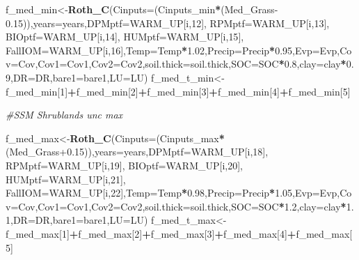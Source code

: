 \documentclass[
  10pt,
  b5paper,
]{book}
\newenvironment{Shaded}{\begin{snugshade}}{\end{snugshade}}
\newcommand{\CommentTok}[1]{\textcolor[rgb]{0.56,0.35,0.01}{\textit{#1}}}
\newcommand{\DataTypeTok}[1]{\textcolor[rgb]{0.13,0.29,0.53}{#1}}
\newcommand{\DecValTok}[1]{\textcolor[rgb]{0.00,0.00,0.81}{#1}}
\newcommand{\FloatTok}[1]{\textcolor[rgb]{0.00,0.00,0.81}{#1}}
\newcommand{\KeywordTok}[1]{\textcolor[rgb]{0.13,0.29,0.53}{\textbf{#1}}}
\newcommand{\NormalTok}[1]{#1}
\newcommand{\OperatorTok}[1]{\textcolor[rgb]{0.81,0.36,0.00}{\textbf{#1}}}
\begin{document}
\begin{Shaded}
\begin{Highlighting}[]
\NormalTok{f_med_min<-}\KeywordTok{Roth_C}\NormalTok{(}\DataTypeTok{Cinputs=}\NormalTok{(Cinputs_min}\OperatorTok{*}\NormalTok{(Med_Grass}\FloatTok{-0.15}\NormalTok{)),}\DataTypeTok{years=}\NormalTok{years,}\DataTypeTok{DPMptf=}\NormalTok{WARM_UP[i,}\DecValTok{12}\NormalTok{], }\DataTypeTok{RPMptf=}\NormalTok{WARM_UP[i,}\DecValTok{13}\NormalTok{], }\DataTypeTok{BIOptf=}\NormalTok{WARM_UP[i,}\DecValTok{14}\NormalTok{], }\DataTypeTok{HUMptf=}\NormalTok{WARM_UP[i,}\DecValTok{15}\NormalTok{], }\DataTypeTok{FallIOM=}\NormalTok{WARM_UP[i,}\DecValTok{16}\NormalTok{],}\DataTypeTok{Temp=}\NormalTok{Temp}\OperatorTok{*}\FloatTok{1.02}\NormalTok{,}\DataTypeTok{Precip=}\NormalTok{Precip}\OperatorTok{*}\FloatTok{0.95}\NormalTok{,}\DataTypeTok{Evp=}\NormalTok{Evp,}\DataTypeTok{Cov=}\NormalTok{Cov,}\DataTypeTok{Cov1=}\NormalTok{Cov1,}\DataTypeTok{Cov2=}\NormalTok{Cov2,}\DataTypeTok{soil.thick=}\NormalTok{soil.thick,}\DataTypeTok{SOC=}\NormalTok{SOC}\OperatorTok{*}\FloatTok{0.8}\NormalTok{,}\DataTypeTok{clay=}\NormalTok{clay}\OperatorTok{*}\FloatTok{0.9}\NormalTok{,}\DataTypeTok{DR=}\NormalTok{DR,}\DataTypeTok{bare1=}\NormalTok{bare1,}\DataTypeTok{LU=}\NormalTok{LU)}
\NormalTok{f_med_t_min<-f_med_min[}\DecValTok{1}\NormalTok{]}\OperatorTok{+}\NormalTok{f_med_min[}\DecValTok{2}\NormalTok{]}\OperatorTok{+}\NormalTok{f_med_min[}\DecValTok{3}\NormalTok{]}\OperatorTok{+}\NormalTok{f_med_min[}\DecValTok{4}\NormalTok{]}\OperatorTok{+}\NormalTok{f_med_min[}\DecValTok{5}\NormalTok{]}

\CommentTok{#SSM Shrublands unc max}

\NormalTok{f_med_max<-}\KeywordTok{Roth_C}\NormalTok{(}\DataTypeTok{Cinputs=}\NormalTok{(Cinputs_max}\OperatorTok{*}\NormalTok{(Med_Grass}\FloatTok{+0.15}\NormalTok{)),}\DataTypeTok{years=}\NormalTok{years,}\DataTypeTok{DPMptf=}\NormalTok{WARM_UP[i,}\DecValTok{18}\NormalTok{], }\DataTypeTok{RPMptf=}\NormalTok{WARM_UP[i,}\DecValTok{19}\NormalTok{], }\DataTypeTok{BIOptf=}\NormalTok{WARM_UP[i,}\DecValTok{20}\NormalTok{], }\DataTypeTok{HUMptf=}\NormalTok{WARM_UP[i,}\DecValTok{21}\NormalTok{], }\DataTypeTok{FallIOM=}\NormalTok{WARM_UP[i,}\DecValTok{22}\NormalTok{],}\DataTypeTok{Temp=}\NormalTok{Temp}\OperatorTok{*}\FloatTok{0.98}\NormalTok{,}\DataTypeTok{Precip=}\NormalTok{Precip}\OperatorTok{*}\FloatTok{1.05}\NormalTok{,}\DataTypeTok{Evp=}\NormalTok{Evp,}\DataTypeTok{Cov=}\NormalTok{Cov,}\DataTypeTok{Cov1=}\NormalTok{Cov1,}\DataTypeTok{Cov2=}\NormalTok{Cov2,}\DataTypeTok{soil.thick=}\NormalTok{soil.thick,}\DataTypeTok{SOC=}\NormalTok{SOC}\OperatorTok{*}\FloatTok{1.2}\NormalTok{,}\DataTypeTok{clay=}\NormalTok{clay}\OperatorTok{*}\FloatTok{1.1}\NormalTok{,}\DataTypeTok{DR=}\NormalTok{DR,}\DataTypeTok{bare1=}\NormalTok{bare1,}\DataTypeTok{LU=}\NormalTok{LU)}
\NormalTok{f_med_t_max<-f_med_max[}\DecValTok{1}\NormalTok{]}\OperatorTok{+}\NormalTok{f_med_max[}\DecValTok{2}\NormalTok{]}\OperatorTok{+}\NormalTok{f_med_max[}\DecValTok{3}\NormalTok{]}\OperatorTok{+}\NormalTok{f_med_max[}\DecValTok{4}\NormalTok{]}\OperatorTok{+}\NormalTok{f_med_max[}\DecValTok{5}\NormalTok{]}


\end{Highlighting}
\end{Shaded}
\end{document}
